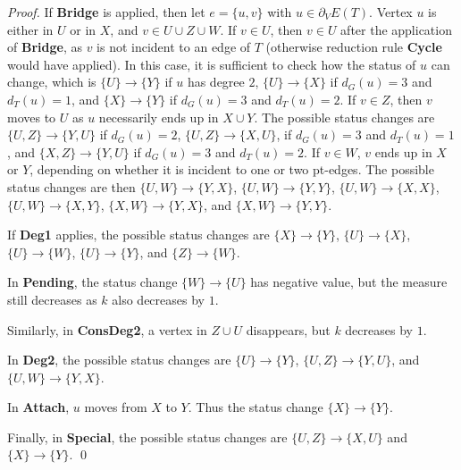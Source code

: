 \documentclass{llncs}
\begin{document}
{\begin{proof}
 If \textbf{Bridge} is applied, then let $e=\{u,v\}$ with $u\in \partial_V E(T)$. Vertex $u$ is either in $U$ or in $X$, and $v \in U \cup Z \cup W$. If $v \in U$, then $v \in U$ after the application of \textbf{Bridge}, as $v$ is not incident to an edge of $T$ (otherwise reduction rule \textbf{Cycle} would have applied). In this case, it is sufficient to check how the status of $u$ can change, which is $\{U\} \rightarrow \{Y\}$ if $u$ has degree $2$, $\{U\} \rightarrow \{X\}$ if $d_G(u)=3$ and $d_T(u)=1$, and $\{X\} \rightarrow \{Y\}$ if $d_G(u)=3$ and $d_T(u)=2$.
 If $v \in Z$, then $v$ moves to $U$ as $u$ necessarily ends up in $X \cup Y$. The possible status changes are $\{U,Z\} \rightarrow \{Y,U\}$ if $d_G(u)=2$, $\{U,Z\} \rightarrow \{X,U\}$, if $d_G(u)=3$ and $d_T(u)=1$, and $\{X,Z\} \rightarrow \{Y,U\}$ if $d_G(u)=3$ and $d_T(u)=2$.
 If $v \in W$, $v$ ends up in $X$ or $Y$, depending on whether it is incident to one or two pt-edges. The possible status changes are then $\{U,W\} \rightarrow \{Y,X\}$, $\{U,W\} \rightarrow \{Y,Y\}$, $\{U,W\} \rightarrow \{X,X\}$, $\{U,W\} \rightarrow \{X,Y\}$, $\{X,W\} \rightarrow \{Y,X\}$, and $\{X,W\} \rightarrow \{Y,Y\}$.
 
 If \textbf{Deg1} applies, the possible status changes are $\{X\} \rightarrow \{Y\}$, $\{U\} \rightarrow \{X\}$, $\{U\} \rightarrow \{W\}$, $\{U\} \rightarrow \{Y\}$, and $\{Z\} \rightarrow \{W\}$.
 
 In \textbf{Pending}, the status change $\{W\} \rightarrow \{U\}$ has negative value, but the measure still decreases as $k$ also decreases by $1$.
 
 Similarly, in \textbf{ConsDeg2}, a vertex in $Z \cup U$ disappears, but $k$ decreases by $1$.
 
 In \textbf{Deg2}, the possible status changes are $\{U\} \rightarrow \{Y\}$, $\{U,Z\} \rightarrow \{Y,U\}$, and $\{U,W\} \rightarrow \{Y,X\}$.
 
 In \textbf{Attach}, $u$ moves from $X$ to $Y$. Thus the status change $\{X\} \rightarrow \{Y\}$.
 
 Finally, in \textbf{Special}, the possible status changes are $\{U,Z\} \rightarrow \{X,U\}$ and $\{X\} \rightarrow \{Y\}$.
\qed
\end{proof}
}
\end{document}
